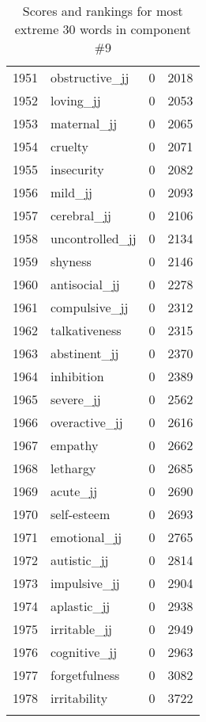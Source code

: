 \begin{longtable}[!htbp]{| rlr@{.}l |}
    1951 & obstructive\_jj & 0 & 2018 \\
    1952 & loving\_jj & 0 & 2053 \\
    1953 & maternal\_jj & 0 & 2065 \\
    1954 & cruelty & 0 & 2071 \\
    1955 & insecurity & 0 & 2082 \\
    1956 & mild\_jj & 0 & 2093 \\
    1957 & cerebral\_jj & 0 & 2106 \\
    1958 & uncontrolled\_jj & 0 & 2134 \\
    1959 & shyness & 0 & 2146 \\
    1960 & antisocial\_jj & 0 & 2278 \\
    1961 & compulsive\_jj & 0 & 2312 \\
    1962 & talkativeness & 0 & 2315 \\
    1963 & abstinent\_jj & 0 & 2370 \\
    1964 & inhibition & 0 & 2389 \\
    1965 & severe\_jj & 0 & 2562 \\
    1966 & overactive\_jj & 0 & 2616 \\
    1967 & empathy & 0 & 2662 \\
    1968 & lethargy & 0 & 2685 \\
    1969 & acute\_jj & 0 & 2690 \\
    1970 & self-esteem & 0 & 2693 \\
    1971 & emotional\_jj & 0 & 2765 \\
    1972 & autistic\_jj & 0 & 2814 \\
    1973 & impulsive\_jj & 0 & 2904 \\
    1974 & aplastic\_jj & 0 & 2938 \\
    1975 & irritable\_jj & 0 & 2949 \\
    1976 & cognitive\_jj & 0 & 2963 \\
    1977 & forgetfulness & 0 & 3082 \\
    1978 & irritability & 0 & 3722 \\
    \hline
    \caption{Scores and rankings for most extreme 30 words in component \#9} \\
\end{longtable}
